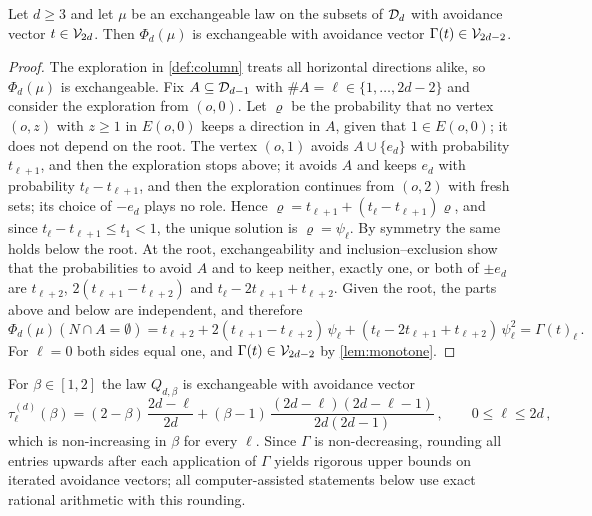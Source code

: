 \documentclass[11pt,letterpaper]{article}
\begin{document}
\begin{lemma}\label{lem:recursion}
Let $d\ge3$ and let $\mu$ be an exchangeable law on the subsets of $\mathcal D_d$ with avoidance vector $t\in\mathcal V_{2d}$. Then $\Phi_d(\mu)$ is exchangeable with avoidance vector $\Gamma(t)\in\mathcal V_{2d-2}$.
\end{lemma}

\begin{proof}
The exploration in \cref{def:column} treats all horizontal directions alike, so $\Phi_d(\mu)$ is exchangeable. Fix $A\subseteq\mathcal D_{d-1}$ with $\#A=\ell\in\{1,\dots,2d-2\}$ and consider the exploration from $(o,0)$. Let $\varrho$ be the probability that no vertex $(o,z)$ with $z\ge1$ in $E(o,0)$ keeps a direction in $A$, given that $1\in E(o,0)$; it does not depend on the root. The vertex $(o,1)$ avoids $A\cup\{e_d\}$ with probability $t_{\ell+1}$, and then the exploration stops above; it avoids $A$ and keeps $e_d$ with probability $t_\ell-t_{\ell+1}$, and then the exploration continues from $(o,2)$ with fresh sets; its choice of $-e_d$ plays no role. Hence $\varrho=t_{\ell+1}+(t_\ell-t_{\ell+1})\varrho$, and since $t_\ell-t_{\ell+1}\le t_1<1$, the unique solution is $\varrho=\psi_\ell$. By symmetry the same holds below the root. At the root, exchangeability and inclusion--exclusion show that the probabilities to avoid $A$ and to keep neither, exactly one, or both of $\pm e_d$ are $t_{\ell+2}$, $2(t_{\ell+1}-t_{\ell+2})$ and $t_\ell-2t_{\ell+1}+t_{\ell+2}$. Given the root, the parts above and below are independent, and therefore
\begin{equation*}
\Phi_d(\mu)(N\cap A=\emptyset)=t_{\ell+2}+2(t_{\ell+1}-t_{\ell+2})\,\psi_\ell+(t_\ell-2t_{\ell+1}+t_{\ell+2})\,\psi_\ell^2=\Gamma(t)_\ell\,.
\end{equation*}
For $\ell=0$ both sides equal one, and $\Gamma(t)\in\mathcal V_{2d-2}$ by \cref{lem:monotone}.
\end{proof}

For $\beta\in[1,2]$ the law $Q_{d,\beta}$ is exchangeable with avoidance vector
\begin{equation}\label{eq:tau}
\tau^{(d)}_\ell(\beta)=(2-\beta)\,\frac{2d-\ell}{2d}+(\beta-1)\,\frac{(2d-\ell)(2d-\ell-1)}{2d(2d-1)}\,,\qquad0\le\ell\le2d\,,
\end{equation}
which is non-increasing in $\beta$ for every $\ell$. Since $\Gamma$ is non-decreasing, rounding all entries upwards after each application of $\Gamma$ yields rigorous upper bounds on iterated avoidance vectors; all computer-assisted statements below use exact rational arithmetic with this rounding.
\end{document}
